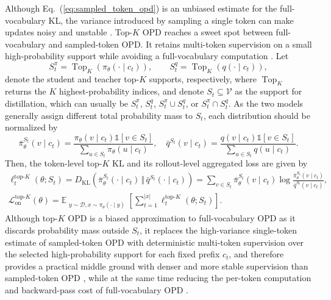 \documentclass{article} %
\begin{document}
Although Eq.~(\ref{eq:sampled_token_opd}) is an unbiased estimate for the full-vocabulary KL, the variance introduced by sampling a single token can make updates noisy and unstable \citep{oh2026klforkl}. 
Top-$K$ OPD reaches a sweet spot between full-vocabulary and sampled-token OPD. It retains multi-token supervision on a small high-probability support while avoiding a full-vocabulary computation \citep{li2026rethinking, fu2026revisiting}. 
Let
\begin{equation}
    S_t^{\pi}=\operatorname{Top}_K\!\left(
      \pi_\theta(\cdot\mid c_t)\right),
    \qquad
    S_t^{q}=\operatorname{Top}_K\!\left(q(\cdot\mid c_t)\right),
    \label{eq:topk_sets}
\end{equation}
denote the student and teacher top-$K$ supports, respectively, where $\operatorname{Top}_K$ returns the $K$ highest-probability indices, and denote $S_t\subseteq\mathcal{V}$ as the support for distillation, which can usually be $S_t^{\pi}$, $S_t^{q}$, $S_t^{\pi} \cup S_t^{q}$, or $S_t^{\pi} \cap S_t^{q}$. As the two models generally assign different total probability mass to $S_t$, each distribution should be normalized by 
\begin{equation}
    \bar{\pi}^{S_t}_\theta(v\mid c_t) = \frac{\pi_\theta(v\mid c_t)\mathds{1}[v\in S_t]}{\sum_{u\in S_t}\pi_\theta(u\mid c_t)}, \quad
    \bar{q}^{S_t}(v\mid c_t) = \frac{q(v\mid c_t)\mathds{1}[v\in S_t]}{\sum_{u\in S_t}q(u\mid c_t)}.
    \label{eq:topk_normalization}
\end{equation}
Then, the token-level top-$K$ KL and its rollout-level aggregated loss are given by
\begin{gather}
    \ell^{\mathrm{top}\text{-}K}_t(\theta;S_t)
    =D_{\mathrm{KL}}\!\left(
      \bar{\pi}^{S_t}_\theta(\cdot\mid c_t)
      \,\Vert\,\bar{q}^{S_t}(\cdot\mid c_t)\right) = \sum_{v\in S_t}\bar{\pi}^{S_t}_\theta(v\mid c_t) \log\frac{\bar{\pi}^{S_t}_\theta(v\mid c_t)} {\bar{q}^{S_t}(v\mid c_t)}, \label{eq:topk_opd_on_sequence}\\
    \mathcal{L}^{\mathrm{top}\text{-}K}_{\mathrm{on}}(\theta)
    =\mathbb{E}_{\substack{y\sim\mathcal{D}, x\sim\pi_\theta(\cdot\mid y)}}
      \left[\sum_{t=1}^{|x|} \ell^{\mathrm{top}\text{-}K}_t(\theta;S_t)\right].
    \label{eq:topk_opd}
\end{gather}
Although top-$K$ OPD is a biased approximation to full-vocabulary OPD as it discards probability mass outside $S_t$, it replaces the high-variance single-token estimate of sampled-token OPD with deterministic multi-token supervision over the selected high-probability support for each fixed prefix $c_t$, and therefore provides a practical middle ground with denser and more stable supervision than sampled-token OPD \citep{fu2026revisiting}, while at the same time reducing the per-token computation and backward-pass cost of full-vocabulary OPD \citep{li2026rethinking, oh2026klforkl}.
\end{document}

